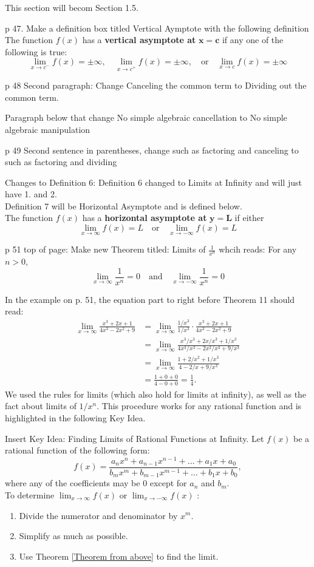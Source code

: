 \documentclass[10pt]{article}
\newcommand{\ds}{\displaystyle}
\begin{document}
This section will becom Section 1.5.

p 47. Make a definition box titled Vertical Aymptote with the following definition
	The function $f(x)$ has a \textbf{vertical asymptote at} $\mathbf{x=c}$ if any one of the following is true: $$\lim_{x\to c^-} f(x)=\pm \infty, \quad \lim_{x\to c^+} f(x)=\pm \infty, \quad \text{or} \quad \lim_{x\to c} f(x)=\pm \infty$$

p 48 Second paragraph:  Change Canceling the common term to Dividing out the common term.

	Paragraph below that change No simple algebraic cancellation to No simple algebraic manipulation

p 49 Second sentence in parentheses, change such as factoring and canceling to such as factoring and dividing

Changes to Definition 6:
	Definition 6 changed to Limits at Infinity and will just have 1. and 2.\\
	Definition 7 will be Horizontal Asymptote and is defined below.\\
		The function $f(x)$ has a \textbf{horizontal asymptote at} $\mathbf{y=L}$ if either $$\lim_{x\to \infty} f(x)=L \quad \text{or} \quad \lim_{x\to -\infty} f(x)=L$$

p 51 top of page:   Make new Theorem titled: Limits of $\ds \frac{1}{x^n}$  whcih reads:  For any $n>0$, $$\lim_{x\to \infty}\frac{1}{x^n}=0 \quad \text{and}\quad  \lim_{x\to -\infty} \frac{1}{x^n}=0$$

In the example on p. 51,  the equation part to right before Theorem 11 should read:  
\begin{align*}
\lim_{x\rightarrow\infty}\frac{x^3+2x+1}{4x^3-2x^2+9} &=
\lim_{x\rightarrow\infty}\frac{1/x^3}{1/x^3}\cdot\frac{x^3+2x+1}{4x^3-2x^2+9}\\ &=\lim_{x\rightarrow\infty}\frac{x^3/x^3+2x/x^3+1/x^3}{4x^3/x^3-2x^2/x^3+9/x^3}\\ &= \lim_{x\rightarrow\infty}\frac{1+2/x^2+1/x^3}{4-2/x+9/x^3}\\
&=\frac{1+0+0}{4-0+0}=\frac{1}{4}.
\end{align*}
We used the rules for limits (which also hold for limits at infinity), as well as the fact about limits of $1/x^n$. This procedure works for any rational function and is highlighted in the following Key Idea.

Insert Key Idea:  Finding Limits of Rational Functions at Infinity.  
Let $f(x)$ be a rational function of the following form:
$$f(x)=\frac{a_nx^n + a_{n-1}x^{n-1}+\dots + a_1x + a_0}{b_mx^m + b_{m-1}x^{m-1} + \dots + b_1x + b_0},$$
where any of the coefficients may be 0 except for $a_n$ and $b_m$.\\
To determine $\ds \lim_{x\to \infty} f(x)$ or $\ds \lim_{x\to -\infty} f(x)$ :
\begin{enumerate}
\item Divide the numerator and denominator by $x^m$.
\item Simplify as much as possible.
\item Use Theorem \ref{Theorem from above} to find the limit.
\end{enumerate}
\end{document}
